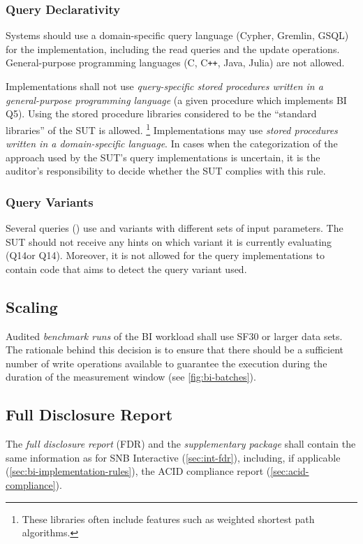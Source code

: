 \subsubsection{Query Declarativity}
\label{sec:bi-query-declarativity}

Systems should use a domain-specific query language (\eg Cypher, Gremlin, GSQL) for the implementation, including the read queries and the update operations.
General-purpose programming languages (\eg C, C\texttt{++}, Java, Julia) are not allowed.

Implementations shall not use \emph{query-specific stored procedures written in a general-purpose programming language} (\eg a given procedure which implements BI Q5).
Using the stored procedure libraries considered to be the ``standard libraries'' of the SUT is allowed.%
\footnote{These libraries often include features such as weighted shortest path algorithms.}
Implementations may use \emph{stored procedures written in a domain-specific language}.
In cases when the categorization of the approach used by the SUT's query implementations is uncertain, it is the auditor's responsibility to decide whether the SUT complies with this rule.

\subsubsection{Query Variants}
\label{sec:bi-query-variants}

Several queries (\eg {}) use \variantA and \variantB variants with different sets of input parameters.
The SUT should not receive any hints on which variant it is currently evaluating (\eg Q14\variantA or Q14\variantB).
Moreover, it is not allowed for the query implementations to contain code that aims to detect the query variant used.

\subsection{Scaling}
\label{sec:bi-scaling}

Audited \emph{benchmark runs} of the BI workload shall use SF30 or larger data sets.
The rationale behind this decision is to ensure that there should be a sufficient number of write operations available to guarantee the execution during the duration of the measurement window (see \autoref{fig:bi-batches}).

\subsection{Full Disclosure Report}
\label{sec:bi-fdr}

The \emph{full disclosure report} (FDR) and the \emph{supplementary package} shall contain
the same information as for SNB Interactive (\autoref{sec:int-fdr}),
including, if applicable (\autoref{sec:bi-implementation-rules}), the ACID compliance report (\autoref{sec:acid-compliance}).
